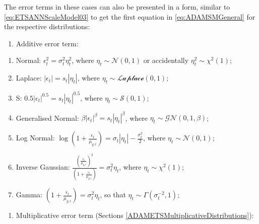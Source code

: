 \documentclass[
]{book}
\providecommand{\tightlist}{%
  \setlength{\itemsep}{0pt}\setlength{\parskip}{0pt}}
\theoremstyle{definition}
\theoremstyle{definition}
\theoremstyle{definition}
\theoremstyle{definition}
\theoremstyle{remark}
\begin{document}
The error terms in these cases can also be presented in a form, similar to \eqref{eq:ETSANNScaleModel03} to get the first equation in \eqref{eq:ADAMSMGeneral} for the respective distributions:

\begin{enumerate}
\def\labelenumi{\arabic{enumi}.}
\tightlist
\item
  Additive error term:
\end{enumerate}

\begin{enumerate}
\def\labelenumi{\alph{enumi}.}
\tightlist
\item
  Normal: \(\epsilon_t^2 = \sigma_t^2 \eta_t^2\), where \(\eta_t \sim \mathcal{N}(0, 1)\) or accidentally \(\eta_t^2 \sim \chi^2(1)\);
\item
  Laplace: \(|\epsilon_t| = s_t |\eta_t|\), where \(\eta_t \sim \mathcal{Laplace}(0, 1)\);
\item
  S: \(0.5 |\epsilon_t|^{0.5} = s_t |\eta_t|^{0.5}\), where \(\eta_t \sim \mathcal{S}(0, 1)\);
\item
  Generalised Normal: \(\beta |\epsilon_t|^{\beta} = s_t |\eta_t|^{\beta}\), where \(\eta_t \sim \mathcal{GN}(0, 1, \beta)\);
\item
  Log Normal: \(\log\left(1+\frac{\epsilon_t}{\mu_{y,t}} \right) = \sigma_t |\eta_t|-\frac{\sigma_t^2}{2}\), where \(\eta_t \sim \mathcal{N}(0, 1)\);
\item
  Inverse Gaussian: \(\frac{\left(\frac{\epsilon_t}{\mu_{y,t}} \right)^2}{\left(1+\frac{\epsilon_t}{\mu_{y,t}} \right)}=\sigma^2_t \eta_t\), where \(\eta_t \sim \chi^2(1)\);
\item
  Gamma: \(\left(1+\frac{\epsilon_t}{\mu_{y,t}} \right) = \sigma_t^2 \eta_t\), so that \(\eta_t \sim \mathcal{\Gamma}(\sigma_t^{-2}, 1)\);
\end{enumerate}

\begin{enumerate}
\def\labelenumi{\arabic{enumi}.}
\setcounter{enumi}{1}
\tightlist
\item
  Multiplicative error term (Sections \ref{ADAMETSMultiplicativeDistributions}):
\end{enumerate}
\end{document}
